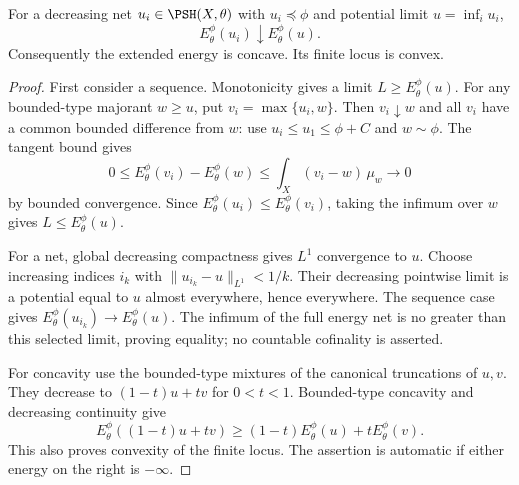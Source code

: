 \begin{proposition}\label{prop:relative-energy-decreasing-continuity}
For a decreasing net $u_i\in\PSH(X,\theta)$ with $u_i\preceq\phi$ and potential limit $u=\inf_i u_i$,
\[
 E_\theta^\phi(u_i)\downarrow E_\theta^\phi(u).
\]
Consequently the extended energy is concave. Its finite locus is convex.
\end{proposition}
\begin{proof}
First consider a sequence. Monotonicity gives a limit $L\geq E_\theta^\phi(u)$. For any bounded-type majorant $w\geq u$, put $v_i=\max\{u_i,w\}$. Then $v_i\downarrow w$ and all $v_i$ have a common bounded difference from $w$: use $u_i\leq u_1\leq\phi+C$ and $w\sim\phi$. The tangent bound gives
\[
 0\leq E_\theta^\phi(v_i)-E_\theta^\phi(w)
                         \leq\int_X(v_i-w)\,\mu_w\longrightarrow0
\]
by bounded convergence. Since $E_\theta^\phi(u_i)\leq E_\theta^\phi(v_i)$, taking the infimum over $w$ gives $L\leq E_\theta^\phi(u)$.

For a net, global decreasing compactness gives $L^1$ convergence to $u$. Choose increasing indices $i_k$ with $\|u_{i_k}-u\|_{L^1}<1/k$. Their decreasing pointwise limit is a potential equal to $u$ almost everywhere, hence everywhere. The sequence case gives $E_\theta^\phi(u_{i_k})\to E_\theta^\phi(u)$. The infimum of the full energy net is no greater than this selected limit, proving equality; no countable cofinality is asserted.

For concavity use the bounded-type mixtures of the canonical truncations of $u,v$. They decrease to $(1-t)u+tv$ for $0<t<1$. Bounded-type concavity and decreasing continuity give
\[
 E_\theta^\phi((1-t)u+tv)
                    \geq(1-t)E_\theta^\phi(u)+tE_\theta^\phi(v).
\]
This also proves convexity of the finite locus. The assertion is automatic if either energy on the right is $-\infty$.
\end{proof}

